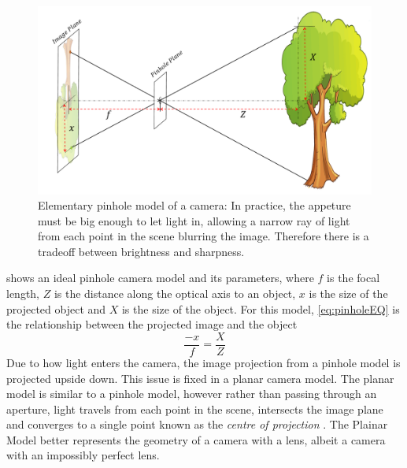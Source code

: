 \documentclass{UoNMCHA}
\numberwithin{equation}{section}
\begin{document}
\begin{figure}[ht]
    \begin{center}
        \includegraphics[width=.8\linewidth]{Figures/Pinhole_model}
        \caption{Elementary pinhole model of a camera: In practice, the appeture must be big enough to let light in, allowing a narrow ray of light from each point in the scene blurring the image. Therefore there is a tradeoff between brightness and sharpness.}
        \label{fig:PinholeModel}
    \end{center}
\end{figure}

 shows an ideal pinhole camera model and its parameters, where $f$ is the focal length, $Z$ is the distance along the optical axis to an object, $x$ is the size of the projected object and $X$ is the size of the object. For this model, \eqref{eq:pinholeEQ} is the relationship between the projected image and the object
\begin{equation}\label{eq:pinholeEQ}
	\frac{-x}{f} = \frac{X}{Z}
\end{equation}
Due to how light enters the camera, the image projection from a pinhole model is projected upside down. This issue is fixed in a planar camera model. The planar model is similar to a pinhole model, however rather than passing through an aperture, light travels from each point in the scene, intersects the image plane and converges to a single point known as the \textit{centre of projection} . The Plainar Model better represents the geometry of a camera with a lens, albeit a camera with an impossibly perfect lens.
\end{document}
